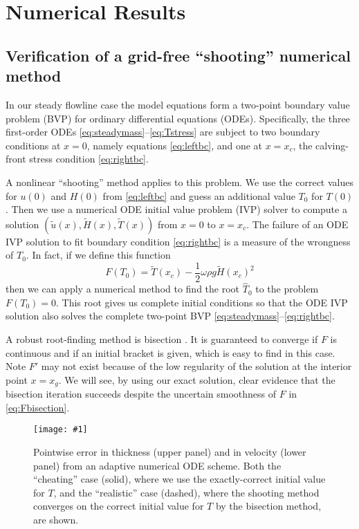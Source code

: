 \documentclass[review,letterpaper]{igs}
\newcommand{\onecol}[1]{\texttt{[image: \#1]}}
\begin{document}
\section{Numerical Results}

\subsection*{Verification of a grid-free ``shooting'' numerical method}  In our steady flowline case the model equations form a two-point boundary value problem (BVP) for ordinary differential equations (ODEs).  Specifically, the three first-order ODEs \eqref{eq:steadymass}--\eqref{eq:Tstress} are subject to two boundary conditions at $x=0$, namely equations \eqref{eq:leftbc}, and one at $x=x_c$, the calving-front stress condition \eqref{eq:rightbc}.  

A nonlinear ``shooting'' method \citep[section 17.1]{Pressetal} applies to this problem.  We use the correct values for $u(0)$ and $H(0)$ from \eqref{eq:leftbc} and guess an additional value $T_0$ for $T(0)$.  Then we use a numerical ODE initial value problem (IVP) solver to compute a solution $(\tilde u(x),\tilde H(x),\tilde T(x))$ from $x=0$ to $x=x_c$.  The failure of an ODE IVP solution to fit boundary condition \eqref{eq:rightbc} is a measure of the wrongness of $T_0$.  In fact, if we define this function
\begin{equation}
F(T_0) = \tilde T(x_c) - \frac{1}{2} \omega \rho g \tilde H(x_c)^2  \label{eq:Fbisection}
\end{equation}
then we can apply a numerical method to find the root $\hat T_0$ to the problem $F(T_0)=0$.  This root gives us complete initial conditions so that the ODE IVP solution also solves the complete two-point BVP \eqref{eq:steadymass}--\eqref{eq:rightbc}.

A robust root-finding method is bisection \citep[section 9.1]{Pressetal}.  It is guaranteed to converge if $F$ is continuous and if an initial bracket is given, which is easy to find in this case.  Note $F'$ may not exist because of the low regularity of the solution at the interior point $x=x_g$.  We will see, by using our exact solution, clear evidence that the bisection iteration succeeds despite the uncertain smoothness of $F$ in \eqref{eq:Fbisection}.

\begin{figure}[ht]
\onecol{exactmarine-error}
\caption{Pointwise error in thickness (upper panel) and in velocity (lower panel) from an adaptive numerical ODE scheme.  Both the ``cheating'' case (solid), where we use the exactly-correct initial value for $T$, and the ``realistic'' case (dashed), where the shooting method converges on the correct initial value for $T$ by the bisection method, are shown.} \label{fig:shoot-error}
\end{figure}
\end{document}
